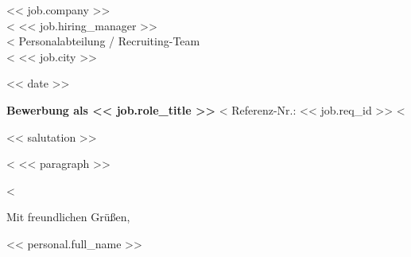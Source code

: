 \documentclass[10pt,a4paper]{article}
\begin{document}

<< job.company >>\\
<%
<< job.hiring_manager >>\\
<%
Personalabteilung / Recruiting-Team\\
<%
<< job.city >>

\vspace{10pt}
<< date >>

\vspace{10pt}
\textbf{Bewerbung als << job.role_title >>}
<%
\hfill \small{Referenz-Nr.: << job.req_id >>}
<%

\vspace{8pt}
<< salutation >>

<%
<< paragraph >>

\vspace{4pt}
<%

Mit freundlichen Grüßen,

\vspace{14pt}
<< personal.full_name >>
\end{document}

